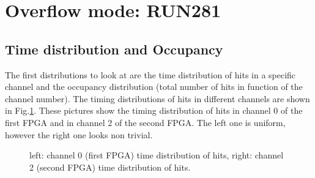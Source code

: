 

\section{Overflow mode: RUN281}
\subsection{Time distribution and Occupancy}\label{over}
The first distributions to look at are the time distribution of hits in a specific channel and the occupancy distribution (total number of hits in function of the channel number).
The timing distributions of hits in different channels are shown in Fig.\ref{fig:1}.
These pictures show the timing distribution of hits in channel 0 of the first FPGA and in channel 2 of the second FPGA.
The left one is uniform, however the right one looks non trivial.

\begin{figure}[H]
  \hspace{-0.5in}
  \caption{
    \label{fig:1}
    left: channel 0 (first FPGA) time distribution of hits, right: channel 2 (second FPGA) time distribution of hits.
  }
\end{figure}

